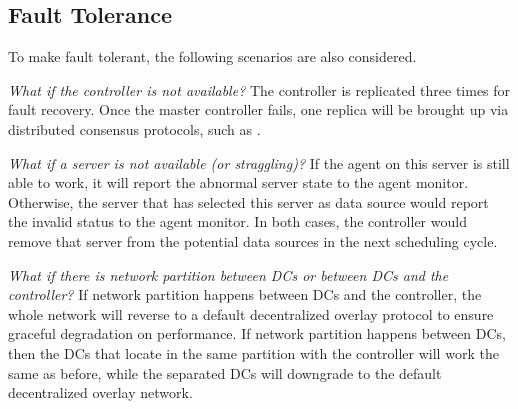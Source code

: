 

\subsection{Fault Tolerance}
\label{subsec:system:fault}
To make \name fault tolerant, the following scenarios are also considered.

\begin{packedenumerate}
\item \emph{What if the controller is not available?} The controller is replicated three times for fault recovery. Once the master controller fails, one replica will be brought up via distributed consensus protocols, such as \cite{lamport1998part}.
\item \emph{What if a server is not available (or straggling)?} If the agent on this server is still able to work, it will report the abnormal server state to the agent monitor. Otherwise, the server that has selected this server as data source would report the invalid status to the agent monitor. In both cases, the controller would remove that server from the potential data sources in the next scheduling cycle.
\item \emph{What if there is network partition between DCs or between DCs and the controller?} If network partition happens between DCs and the controller, the whole network will reverse to a default decentralized overlay protocol to ensure graceful degradation on performance. If network partition happens between DCs, then the DCs that locate in the same partition with the controller will work the same as before, while the separated DCs will downgrade to the default decentralized overlay network.
\end{packedenumerate}
%
%
%
%
%



